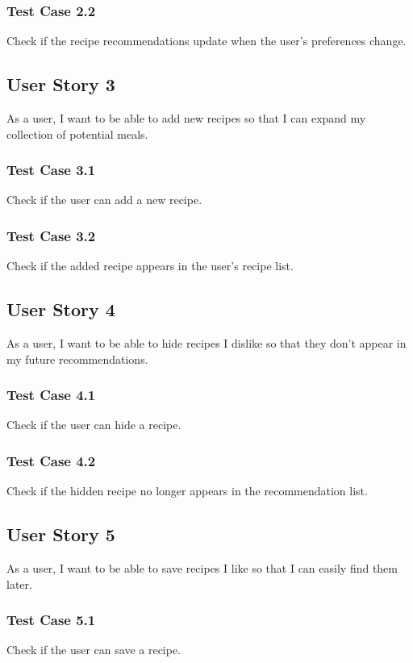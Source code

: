 \documentclass[11pt, letterpaper]{report}
\begin{document}
\subsubsection{Test Case 2.2}
Check if the recipe recommendations update when the user's preferences change.

\subsection{User Story 3}
As a user, I want to be able to add new recipes so that I can expand my collection of potential meals.

\subsubsection{Test Case 3.1}
Check if the user can add a new recipe.

\subsubsection{Test Case 3.2}
Check if the added recipe appears in the user's recipe list.

\subsection{User Story 4}
As a user, I want to be able to hide recipes I dislike so that they don't appear in my future recommendations.

\subsubsection{Test Case 4.1}
Check if the user can hide a recipe.

\subsubsection{Test Case 4.2}
Check if the hidden recipe no longer appears in the recommendation list.

\subsection{User Story 5}
As a user, I want to be able to save recipes I like so that I can easily find them later.

\subsubsection{Test Case 5.1}
Check if the user can save a recipe.
\end{document}
